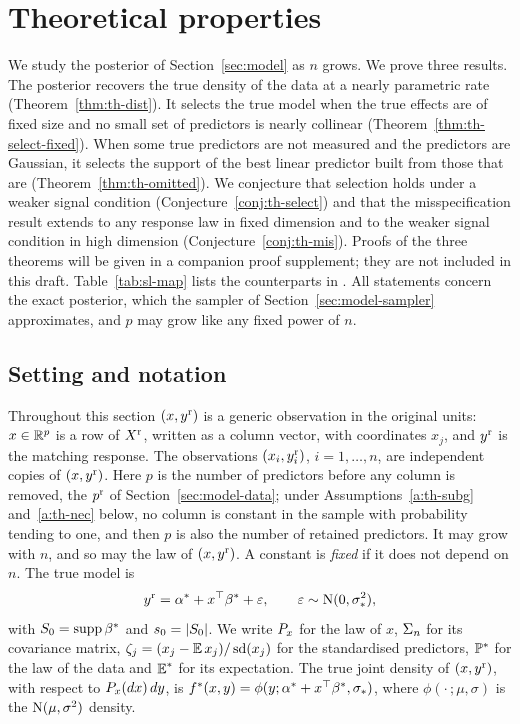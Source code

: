 \section{Theoretical properties}\label{sec:theory}

We study the posterior of Section~\ref{sec:model} as $n$ grows. We prove three results. The posterior recovers the true density of the data at a
nearly parametric rate (Theorem~\ref{thm:th-dist}). It selects the true model when the true effects are of fixed
size and no small set of predictors is nearly collinear (Theorem~\ref{thm:th-select-fixed}). When some true predictors
are not measured and the predictors are Gaussian, it selects the support of the best linear predictor built from those
that are (Theorem~\ref{thm:th-omitted}). We conjecture that selection holds under a weaker signal condition
(Conjecture~\ref{conj:th-select}) and that the misspecification result extends to any response law in fixed dimension and to the weaker signal condition
in high dimension (Conjecture~\ref{conj:th-mis}). Proofs of the three theorems will be given in a companion proof
supplement; they are not included in this draft. Table~\ref{tab:sl-map} lists the counterparts in \citet{SongLiang2015}. All statements
concern the exact posterior, which the sampler of Section~\ref{sec:model-sampler} approximates, and $p$ may grow like
any fixed power of $n$.

\subsection{Setting and notation}\label{sec:theory-setting}

Throughout this section $(x,\yr)$ is a generic observation in the original units: $x\in\R^p$ is a row of $\Xr$,
written as a column vector, with coordinates $x_j$, and $\yr$ is the matching response. The observations
$(x_i,\yr_i)$, $i=1,\dots,n$, are independent copies of $(x,\yr)$. Here $p$ is the number of predictors before any
column is removed, the $\praw$ of Section~\ref{sec:model-data}; under Assumptions~\ref{a:th-subg} and~\ref{a:th-nec} below, no column is
constant in the sample with probability tending to one, and then $p$ is also the number of retained predictors. It
may grow with $n$, and so may the law of $(x,\yr)$. A constant is \emph{fixed} if it does not depend on $n$. The true model is
\begin{equation}\label{eq:th-truth}
  \yr=\alpha^*+x^\top\bstar+\varepsilon,\qquad \varepsilon\sim\Normal(0,\sigs^2),
\end{equation}
with $\Sz=\supp\bstar$ and $\sz=\abs{\Sz}$. We write $\Px$ for the law of $x$, $\Sig$ for its covariance matrix,
$\zeta_j=(x_j-\E x_j)/\sd(x_j)$ for the standardised predictors, $\P^*$ for the law of the data and $\E^*$ for its
expectation. The true joint density of $(x,\yr)$, with respect to $\Px(dx)\,dy$, is
$f^*(x,y)=\phi(y;\alpha^*+x^\top\bstar,\sigs)$, where $\phi(\cdot\,;\mu,\sigma)$ is the $\Normal(\mu,\sigma^2)$ density.

